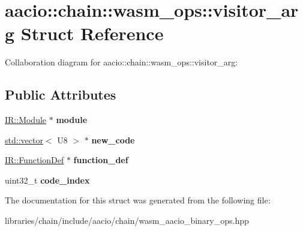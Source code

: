 \hypertarget{structaacio_1_1chain_1_1wasm__ops_1_1visitor__arg}{}\section{aacio\+:\+:chain\+:\+:wasm\+\_\+ops\+:\+:visitor\+\_\+arg Struct Reference}
\label{structaacio_1_1chain_1_1wasm__ops_1_1visitor__arg}


Collaboration diagram for aacio\+:\+:chain\+:\+:wasm\+\_\+ops\+:\+:visitor\+\_\+arg\+:
\subsection*{Public Attributes}
\begin{DoxyCompactItemize}
\item 
\mbox{\label{structaacio_1_1chain_1_1wasm__ops_1_1visitor__arg_ad652e8a745bb49c1adcd7819a6aaed63}} 
\mbox{\hyperlink{struct_i_r_1_1_module}{I\+R\+::\+Module}} $\ast$ {\bfseries module}
\item 
\mbox{\label{structaacio_1_1chain_1_1wasm__ops_1_1visitor__arg_a9d669fc41528232c68f9cc2d2f078614}} 
\mbox{\hyperlink{classstd_1_1vector}{std\+::vector}}$<$ U8 $>$ $\ast$ {\bfseries new\+\_\+code}
\item 
\mbox{\label{structaacio_1_1chain_1_1wasm__ops_1_1visitor__arg_afdaa49042b8dad388afe688da0006284}} 
\mbox{\hyperlink{struct_i_r_1_1_function_def}{I\+R\+::\+Function\+Def}} $\ast$ {\bfseries function\+\_\+def}
\item 
\mbox{\label{structaacio_1_1chain_1_1wasm__ops_1_1visitor__arg_a3681e37226cbbc7e82c6328c17ea73ec}} 
uint32\+\_\+t {\bfseries code\+\_\+index}
\end{DoxyCompactItemize}


The documentation for this struct was generated from the following file\+:\begin{DoxyCompactItemize}
\item 
libraries/chain/include/aacio/chain/wasm\+\_\+aacio\+\_\+binary\+\_\+ops.\+hpp\end{DoxyCompactItemize}
